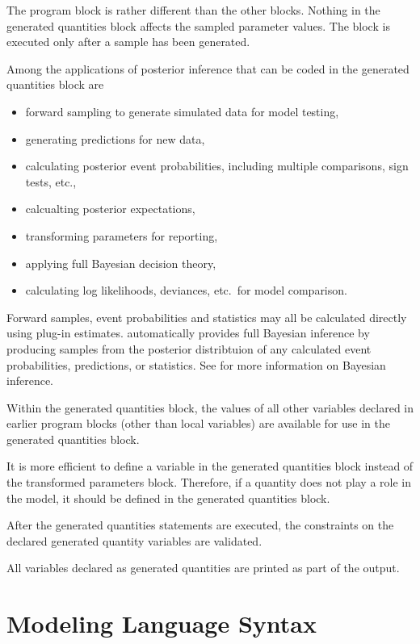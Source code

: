 The  program block is rather different than
the other blocks.  Nothing in the generated quantities block affects
the sampled parameter values.  The block is executed only after a
sample has been generated.  

Among the applications of posterior inference that can be coded in the
generated quantities block are
%
\begin{itemize}
\item forward sampling to generate simulated data for model testing,
\item generating predictions for new data,
\item calculating posterior event probabilities, including multiple comparisons,
  sign tests, etc.,
\item calcualting posterior expectations,
\item transforming parameters for reporting,
\item applying full Bayesian decision theory,
\item calculating log likelihoods, deviances, etc.\ for model comparison.
\end{itemize}
%
Forward samples, event probabilities and statistics may all be
calculated directly using plug-in estimates.  \Stan automatically
provides full Bayesian inference by producing samples from the
posterior distribtuion of any calculated event probabilities,
predictions, or statistics.  See  for more
information on Bayesian inference.

Within the generated quantities block, the values of all other variables
declared in earlier program blocks (other than local variables) are
available for use in the generated quantities block.

It is more efficient to define a variable in the generated quantities
block instead of the transformed parameters block.  Therefore, if a
quantity does not play a role in the model, it should be defined in
the generated quantities block.  

After the generated quantities statements are executed, the constraints
on the declared generated quantity variables are validated.

All variables declared as generated quantities are printed as part of
the output. 

\chapter{Modeling Language Syntax}

